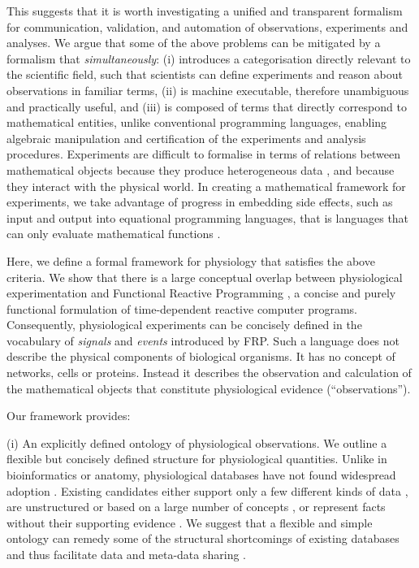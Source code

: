 This suggests that it is worth investigating a unified and transparent
formalism for communication, validation, and automation of
observations, experiments and analyses. We argue that some of the above
problems can be mitigated by a formalism that 
\emph{simultaneously}: (i) introduces a
categorisation directly relevant to the scientific field, such that
scientists can define experiments and reason about observations in
familiar terms, (ii) is machine executable, therefore unambiguous and
practically useful, and (iii) is composed of terms that directly
correspond to mathematical entities, unlike conventional programming
languages, enabling algebraic manipulation and certification of the
experiments and analysis procedures.  Experiments are difficult to
formalise in terms of relations between mathematical objects because
they produce heterogeneous data \citep{Tukey1962}, and because they
interact with the physical world. In creating a mathematical framework
for experiments, we take advantage of progress in embedding side
effects, such as input and output \citep{PeytonJones2002, Roy2004,
  Wadler1995} into equational programming languages, that is languages
that can only evaluate mathematical functions \citep{Church1941}.

Here, we define a formal framework for physiology
that satisfies the above criteria. We show that there
is a large conceptual overlap between physiological experimentation
and Functional Reactive Programming \citep[FRP;][]{Elliott1997,
  Nilsson2002}, a concise and purely functional formulation of
time-dependent reactive computer programs. Consequently, physiological
experiments can be concisely defined in the vocabulary of
\emph{signals} and \emph{events} introduced by FRP. Such a language
does not describe the physical components of biological organisms. It
has no concept of networks, cells or proteins. Instead it describes
the observation and calculation of the mathematical objects that
constitute physiological evidence (``observations'').

Our framework provides:

(i) An explicitly defined ontology of physiological observations. We
outline a flexible but concisely defined structure for physiological
quantities.  Unlike in bioinformatics or anatomy, physiological
databases have not found widespread adoption \citep{Herz2008,
  Amari2002}. Existing candidates either support only a few different
kinds of data \citep{Jessop2010}, are unstructured \citep{Teeters2008}
or based on a large number of concepts \citep{Frishkoff2009}, or
represent facts without their supporting evidence \citep{Katz2010}.
We suggest that a flexible and simple ontology
can remedy some of the structural shortcomings of existing databases
\citep{Gardner2005, Amari2002} and thus facilitate data and meta-data
sharing \citep{Insel2003}.


